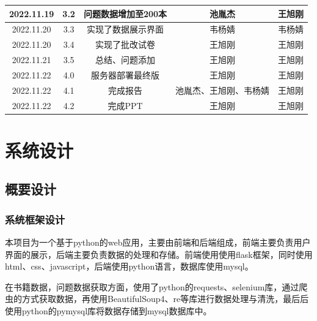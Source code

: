 \documentclass[twoside,11pt]{article}
\begin{document}
\begin{table}[H]
{\begin{tabular}{|c|c|c|c|c|}
            \hline
            2022.11.19 & 3.2  & 问题数据增加至200本  & 池胤杰                 & 王旭刚 \\
            \hline
            2022.11.20 & 3.3  & 实现了数据展示界面   & 韦杨婧                 & 韦杨婧 \\
            \hline
            2022.11.20 & 3.4  & 实现了批改试卷       & 王旭刚                 & 王旭刚 \\
            \hline
            2022.11.21 & 3.5  & 总结、问题添加       & 王旭刚                 & 王旭刚 \\
            \hline
            2022.11.22 & 4.0  & 服务器部署最终版     & 王旭刚                 & 王旭刚 \\
            \hline
            2022.11.22 & 4.1  & 完成报告             & 池胤杰、王旭刚、韦杨婧 & 王旭刚 \\
            \hline
            2022.11.22 & 4.2  & 完成PPT              & 王旭刚                 & 王旭刚 \\
            \hline
        \end{tabular}}

    \label{tab:tab1}
\end{table}

\newpage



\begin{center}
    \tableofcontents
\end{center}
\thispagestyle{empty}
\newpage





\section{系统设计}
\subsection{概要设计}
\subsubsection{系统框架设计}

本项目为一个基于python的web应用，主要由前端和后端组成，前端主要负责用户界面的展示，后端主要负责数据的处理和存储。前端使用使用flask框架，同时使用html、css、javascript，后端使用python语言，数据库使用mysql。

在书籍数据，问题数据获取方面，使用了python的requests、selenium库，通过爬虫的方式获取数据，再使用BeautifulSoup4、re等库进行数据处理与清洗，最后后使用python的pymysql库将数据存储到mysql数据库中。
\end{document}
